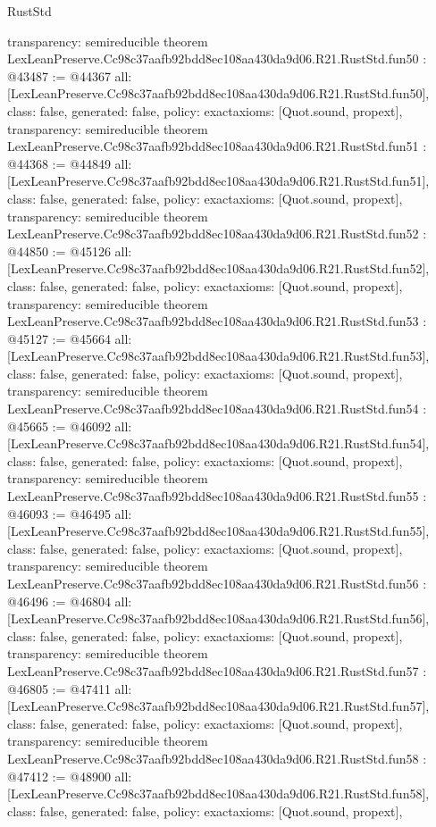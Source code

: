 \begin{lexlean}{RustStd}
\begin{coremodule}
{  transparency: semireducible
}
theorem LexLeanPreserve.Cc98c37aafb92bdd8ec108aa430da9d06.R21.RustStd.fun50 : @43487 := @44367 {
  all: [LexLeanPreserve.Cc98c37aafb92bdd8ec108aa430da9d06.R21.RustStd.fun50],
  class: false,
  generated: false,
  policy: exact{axioms: [Quot.sound, propext]},
  transparency: semireducible
}
theorem LexLeanPreserve.Cc98c37aafb92bdd8ec108aa430da9d06.R21.RustStd.fun51 : @44368 := @44849 {
  all: [LexLeanPreserve.Cc98c37aafb92bdd8ec108aa430da9d06.R21.RustStd.fun51],
  class: false,
  generated: false,
  policy: exact{axioms: [Quot.sound, propext]},
  transparency: semireducible
}
theorem LexLeanPreserve.Cc98c37aafb92bdd8ec108aa430da9d06.R21.RustStd.fun52 : @44850 := @45126 {
  all: [LexLeanPreserve.Cc98c37aafb92bdd8ec108aa430da9d06.R21.RustStd.fun52],
  class: false,
  generated: false,
  policy: exact{axioms: [Quot.sound, propext]},
  transparency: semireducible
}
theorem LexLeanPreserve.Cc98c37aafb92bdd8ec108aa430da9d06.R21.RustStd.fun53 : @45127 := @45664 {
  all: [LexLeanPreserve.Cc98c37aafb92bdd8ec108aa430da9d06.R21.RustStd.fun53],
  class: false,
  generated: false,
  policy: exact{axioms: [Quot.sound, propext]},
  transparency: semireducible
}
theorem LexLeanPreserve.Cc98c37aafb92bdd8ec108aa430da9d06.R21.RustStd.fun54 : @45665 := @46092 {
  all: [LexLeanPreserve.Cc98c37aafb92bdd8ec108aa430da9d06.R21.RustStd.fun54],
  class: false,
  generated: false,
  policy: exact{axioms: [Quot.sound, propext]},
  transparency: semireducible
}
theorem LexLeanPreserve.Cc98c37aafb92bdd8ec108aa430da9d06.R21.RustStd.fun55 : @46093 := @46495 {
  all: [LexLeanPreserve.Cc98c37aafb92bdd8ec108aa430da9d06.R21.RustStd.fun55],
  class: false,
  generated: false,
  policy: exact{axioms: [Quot.sound, propext]},
  transparency: semireducible
}
theorem LexLeanPreserve.Cc98c37aafb92bdd8ec108aa430da9d06.R21.RustStd.fun56 : @46496 := @46804 {
  all: [LexLeanPreserve.Cc98c37aafb92bdd8ec108aa430da9d06.R21.RustStd.fun56],
  class: false,
  generated: false,
  policy: exact{axioms: [Quot.sound, propext]},
  transparency: semireducible
}
theorem LexLeanPreserve.Cc98c37aafb92bdd8ec108aa430da9d06.R21.RustStd.fun57 : @46805 := @47411 {
  all: [LexLeanPreserve.Cc98c37aafb92bdd8ec108aa430da9d06.R21.RustStd.fun57],
  class: false,
  generated: false,
  policy: exact{axioms: [Quot.sound, propext]},
  transparency: semireducible
}
theorem LexLeanPreserve.Cc98c37aafb92bdd8ec108aa430da9d06.R21.RustStd.fun58 : @47412 := @48900 {
  all: [LexLeanPreserve.Cc98c37aafb92bdd8ec108aa430da9d06.R21.RustStd.fun58],
  class: false,
  generated: false,
  policy: exact{axioms: [Quot.sound, propext]},
}
\end{coremodule}
\end{lexlean}
